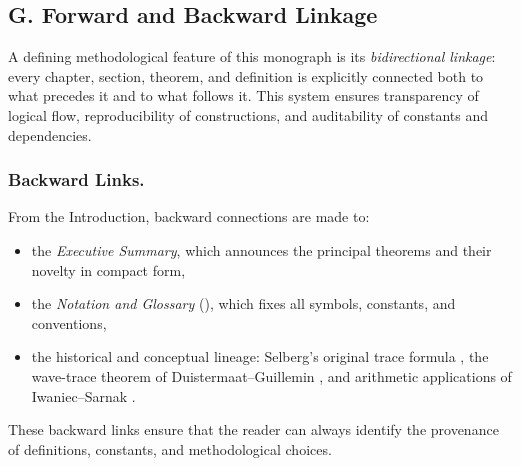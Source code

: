 
\subsection*{G. Forward and Backward Linkage}

A defining methodological feature of this monograph is its \emph{bidirectional linkage}:
every chapter, section, theorem, and definition is explicitly connected both to what precedes it
and to what follows it. This system ensures transparency of logical flow,
reproducibility of constructions, and auditability of constants and dependencies.

\subsubsection*{Backward Links.}
From the Introduction, backward connections are made to:
\begin{itemize}
  \item the \emph{Executive Summary}, which announces the principal theorems and their novelty in compact form,
  \item the \emph{Notation and Glossary} (), which fixes all symbols, constants, and conventions,
  \item the historical and conceptual lineage: Selberg’s original trace formula \cite{Selberg1956},
        the wave-trace theorem of Duistermaat–Guillemin \cite{DG1975}, and
        arithmetic applications of Iwaniec–Sarnak \cite{Iwaniec2002}.
\end{itemize}
These backward links ensure that the reader can always identify the provenance of definitions,
constants, and methodological choices.

